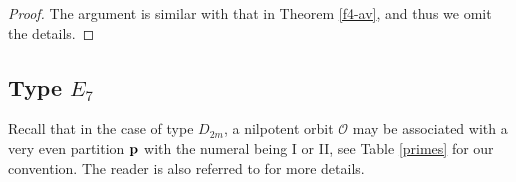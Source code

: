 \documentclass[reqno,12pt]{amsart}
\numberwithin{equation}{section}
\theoremstyle{plain}
\theoremstyle{definition}
\newcommand{\lam}{\lambda}
\newcommand{\Ann}{\mathrm{Ann}}
\renewcommand{\subset}{\subseteq}
\newcommand{\aff}{ \mathbf{a} }
\newcommand{\gkd}{\operatorname{GKdim}}
\begin{document}
\begin{proof}



The  argument is similar with that in Theorem \ref{f4-av}, and thus we omit the details.



\end{proof}


\subsection{Type \texorpdfstring{$E_7$}{}} 
Recall that in the case of type $D_{2m}$, a nilpotent orbit $\mathcal{O}$  may be associated with a very even partition ${\bf p}$ with the  numeral being I or II, see Table \ref{primes} for our convention. The reader is also referred to \cite{BMW} for more details. %
\end{document}
